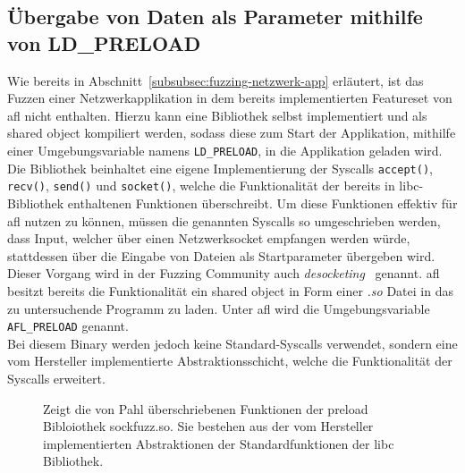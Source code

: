 
\subsection{Übergabe von Daten als Parameter mithilfe von LD\_PRELOAD}\label{subsec: desocketing}
Wie bereits in Abschnitt~\ref{subsubsec:fuzzing-netzwerk-app} erläutert, ist das Fuzzen einer Netzwerkapplikation in dem bereits
implementierten Featureset von \gls{afl} nicht enthalten.
Hierzu kann eine Bibliothek selbst implementiert und als shared object kompiliert werden, sodass diese zum Start
der Applikation, mithilfe einer Umgebungsvariable namens \texttt{LD\_PRELOAD}, in die Applikation geladen wird.
Die Bibliothek beinhaltet eine eigene Implementierung der Syscalls \texttt{accept()}, \texttt{recv()}, \texttt{send()}
und \texttt{socket()}, welche die Funktionalität der bereits in libc-Bibliothek enthaltenen Funktionen überschreibt.
Um diese Funktionen effektiv für \gls{afl} nutzen zu können, müssen die genannten Syscalls so umgeschrieben werden, dass
Input, welcher über einen Netzwerksocket empfangen werden würde, stattdessen über die Eingabe von Dateien als Startparameter
übergeben wird.
Dieser Vorgang wird in der Fuzzing Community auch \textit{desocketing}~\cite{desocketing} genannt.
\gls{afl} besitzt bereits die Funktionalität ein shared object in Form einer \textit{.so} Datei in das zu untersuchende
Programm zu laden.
Unter \gls{afl} wird die Umgebungsvariable \texttt{AFL\_PRELOAD} genannt.\\
Bei diesem Binary werden jedoch keine Standard-Syscalls verwendet, sondern eine vom Hersteller implementierte Abstraktionsschicht,
welche die Funktionalität der Syscalls erweitert.
\begin{figure}[h]
    \caption{Zeigt die von Pahl überschriebenen Funktionen der preload Bibloiothek sockfuzz.so.
            Sie bestehen aus der vom Hersteller implementierten Abstraktionen der Standardfunktionen
            der libc Bibliothek.}\label{fig:overwritten-funcs}
\end{figure}\\
